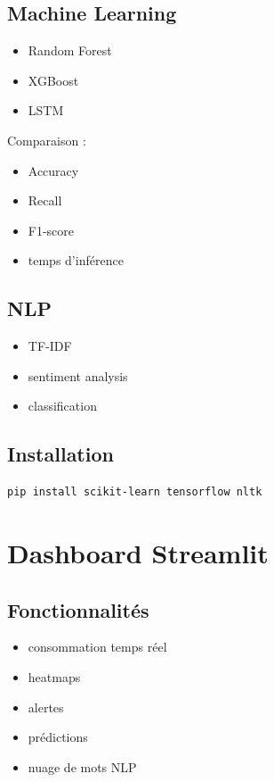 \documentclass[12pt,a4paper]{report}
\begin{document}
\subsection{Machine Learning}

\begin{itemize}
    \item Random Forest
    \item XGBoost
    \item LSTM
\end{itemize}

Comparaison :

\begin{itemize}
    \item Accuracy
    \item Recall
    \item F1-score
    \item temps d’inférence
\end{itemize}

\subsection{NLP}

\begin{itemize}
    \item TF-IDF
    \item sentiment analysis
    \item classification
\end{itemize}

\subsection{Installation}

\begin{verbatim}
pip install scikit-learn tensorflow nltk
\end{verbatim}

\section{Dashboard Streamlit}

\subsection{Fonctionnalités}

\begin{itemize}
    \item consommation temps réel
    \item heatmaps
    \item alertes
    \item prédictions
    \item nuage de mots NLP
\end{itemize}
\end{document}
